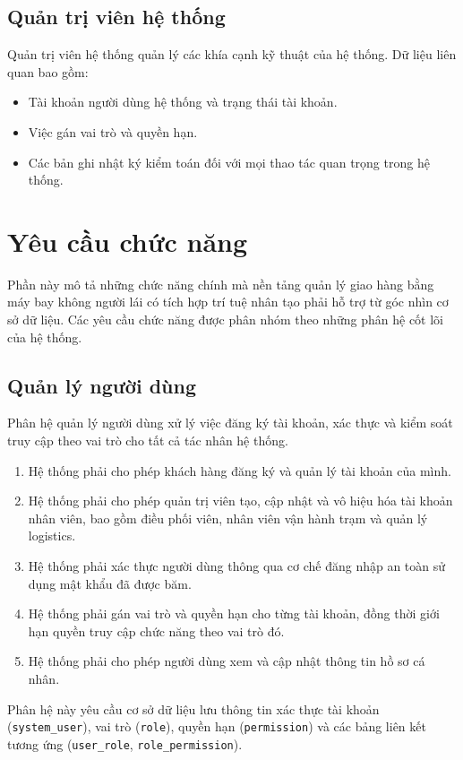 \subsection{Quản trị viên hệ thống}

Quản trị viên hệ thống quản lý các khía cạnh kỹ thuật của hệ thống. Dữ liệu liên quan bao gồm:
\begin{itemize}
    \item Tài khoản người dùng hệ thống và trạng thái tài khoản.
    \item Việc gán vai trò và quyền hạn.
    \item Các bản ghi nhật ký kiểm toán đối với mọi thao tác quan trọng trong hệ thống.
\end{itemize}

\section{Yêu cầu chức năng}\label{s:functional}

Phần này mô tả những chức năng chính mà nền tảng quản lý giao hàng bằng máy bay không người lái có tích hợp trí tuệ nhân tạo phải hỗ trợ từ góc nhìn cơ sở dữ liệu. Các yêu cầu chức năng được phân nhóm theo những phân hệ cốt lõi của hệ thống.

\subsection{Quản lý người dùng}

Phân hệ quản lý người dùng xử lý việc đăng ký tài khoản, xác thực và kiểm soát truy cập theo vai trò cho tất cả tác nhân hệ thống.
\begin{enumerate}
    \item Hệ thống phải cho phép khách hàng đăng ký và quản lý tài khoản của mình.
    \item Hệ thống phải cho phép quản trị viên tạo, cập nhật và vô hiệu hóa tài khoản nhân viên, bao gồm điều phối viên, nhân viên vận hành trạm và quản lý logistics.
    \item Hệ thống phải xác thực người dùng thông qua cơ chế đăng nhập an toàn sử dụng mật khẩu đã được băm.
    \item Hệ thống phải gán vai trò và quyền hạn cho từng tài khoản, đồng thời giới hạn quyền truy cập chức năng theo vai trò đó.
    \item Hệ thống phải cho phép người dùng xem và cập nhật thông tin hồ sơ cá nhân.
\end{enumerate}
Phân hệ này yêu cầu cơ sở dữ liệu lưu thông tin xác thực tài khoản (\texttt{system\_user}), vai trò (\texttt{role}), quyền hạn (\texttt{permission}) và các bảng liên kết tương ứng (\texttt{user\_role}, \texttt{role\_permission}).

